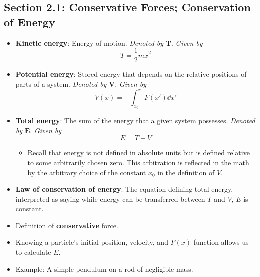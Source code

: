 \documentclass[../notes.tex]{subfiles}
\begin{document}
\subsection*{Section 2.1: Conservative Forces; Conservation of Energy}
\begin{itemize}
    \item \textbf{Kinetic energy}: Energy of motion. \emph{Denoted by} $\bm{T}$. \emph{Given by}
    \begin{equation*}
        T = \frac{1}{2}m\dot{x}^2
    \end{equation*}
    \item \textbf{Potential energy}: Stored energy that depends on the relative positions of parts of a system. \emph{Denoted by} $\bm{V}$. \emph{Given by}
    \begin{equation*}
        V(x) = -\int_{x_0}^xF(x')\dd{x'}
    \end{equation*}
    \item \textbf{Total energy}: The sum of the energy that a given system possesses. \emph{Denoted by} $\bm{E}$. \emph{Given by}
    \begin{equation*}
        E = T+V
    \end{equation*}
    \begin{itemize}
        \item Recall that energy is not defined in absolute units but is defined relative to some arbitrarily chosen zero. This arbitration is reflected in the math by the arbitrary choice of the constant $x_0$ in the definition of $V$.
    \end{itemize}
    \item \textbf{Law of conservation of energy}: The equation defining total energy, interpreted as saying while energy can be transferred between $T$ and $V$, $E$ is constant.
    \item Definition of \textbf{conservative} force.
    \item Knowing a particle's initial position, velocity, and $F(x)$ function allows us to calculate $E$.
    \item Example: A simple pendulum on a rod of negligible mass.
    \begin{figure}[h!]
        \centering
\end{figure}
\end{itemize}
\end{document}
